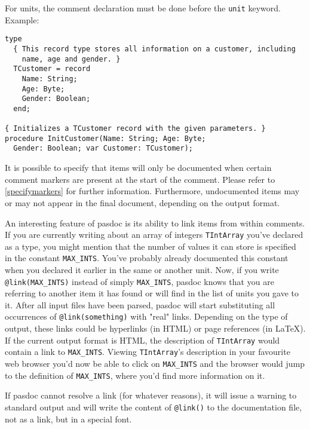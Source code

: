 \documentclass[11pt]{article}
\begin{document}
For units, the comment declaration must be done before the {\tt unit} keyword. 
Example:
\begin{verbatim}
type
  { This record type stores all information on a customer, including
    name, age and gender. }
  TCustomer = record
    Name: String;
    Age: Byte;
    Gender: Boolean;
  end;

{ Initializes a TCustomer record with the given parameters. }
procedure InitCustomer(Name: String; Age: Byte;
  Gender: Boolean; var Customer: TCustomer);
\end{verbatim}

It is possible to specify that items will only be documented when certain
comment markers are present at the start of the comment. Please refer
to \ref{specifymarkers} for further information. Furthermore, undocumented
items may or may not appear in the final document, depending on the
output format.

An interesting feature of pasdoc is its ability to link items from within
comments. If you are currently writing about an array of integers {\tt TIntArray} you've
declared as a type, you might mention that the number of values it can store
is specified in the constant {\tt MAX\_INTS}.
You've probably already documented this constant when you declared it earlier
in the same or another unit.
Now, if you write {\tt @link(MAX\_INTS)} instead of simply {\tt MAX\_INTS},
pasdoc knows that you are referring to another item it has found or will find
in the list of units you gave to it.
After all input files have been parsed, pasdoc will start substituting all
occurrences of {\tt @link(something)} with "real" links.
Depending on the type of output, these links could be hyperlinks (in HTML)
or page references (in \LaTeX).
If the current output format is HTML, the description of {\tt TIntArray} would
contain a link to {\tt MAX\_INTS}.
Viewing {\tt TIntArray}'s description in your favourite web browser you'd
now be able to click on {\tt MAX\_INTS} and the browser would jump to the
definition of {\tt MAX\_INTS}, where you'd find more information on it.

If pasdoc cannot resolve a link (for whatever reasons), it will issue a
warning to standard output and will write the content of {\tt @link()}
to the documentation file, not as a link, but in a special font.
\end{document}
